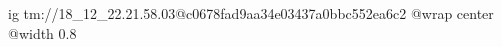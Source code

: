  
 
 
 
 

\qqSecOrig


\ifcmt
  ig tm://18_12_22.21.58.03@c0678fad9aa34e03437a0bbc552ea6c2
  @wrap center
  @width 0.8
\fi

